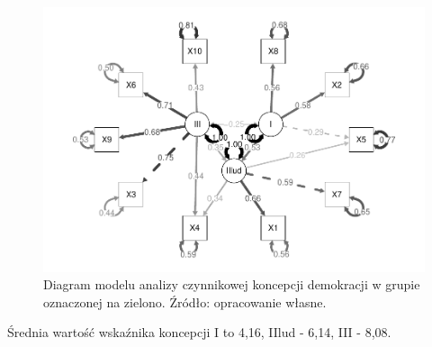\documentclass[12pt]{article}
\begin{document}
\begin{figure}

{\centering \includegraphics{text_ASA_files/figure-latex/diagram-1-1} 

}

\caption{Diagram modelu analizy czynnikowej koncepcji demokracji w grupie oznaczonej na zielono. Źródło: opracowanie własne.}\label{fig:diagram-1}
\end{figure}

Średnia wartość wskaźnika koncepcji I to 4,16, IIlud - 6,14, III - 8,08.
\end{document}
